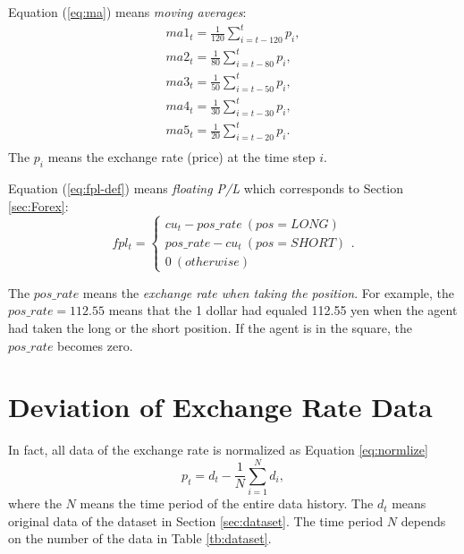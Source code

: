 Equation (\ref{eq:ma}) means {\it moving averages}:
\begin{equation}
  \label{eq:ma}
  \begin{array}{l}
    ma1_{t} = \frac{1}{120} \displaystyle \sum_{i=t-120}^{t} p_i, \\
    ma2_{t} = \frac{1}{80} \displaystyle \sum_{i=t-80}^{t} p_i,   \\
    ma3_{t} = \frac{1}{50} \displaystyle \sum_{i=t-50}^{t} p_i,   \\
    ma4_{t} = \frac{1}{30} \displaystyle \sum_{i=t-30}^{t} p_i,   \\
    ma5_{t} = \frac{1}{20} \displaystyle \sum_{i=t-20}^{t} p_i.   \\
  \end{array}
\end{equation}
The $p_i$ means the exchange rate (price) at the time step $i$.

Equation (\ref{eq:fpl-def}) means {\it floating P/L} which corresponds to Section \ref{sec:Forex}:
\begin{equation}
  \label{eq:fpl-def}
  fpl_{t} =
  \left\{
    \begin{array}{l}
      cu_{t} - pos\_rate  \ (pos=LONG)\\
      pos\_rate - cu_{t}  \ (pos=SHORT)\\
      0 \ (otherwise)
    \end{array}
  \right..
\end{equation}

The $pos\_rate$ means the {\it exchange rate when taking the position}. For example, the $pos\_rate=112.55$ means that the 1 dollar had equaled 112.55 yen when the agent had taken the long or the short position. If the agent is in the square, the $pos\_rate$ becomes zero.

\section{Deviation of Exchange Rate Data}
\label{sec:devEx}
In fact, all data of the exchange rate is normalized as Equation \ref{eq:normlize} 
\begin{equation}
  \label{eq:normlize}
  p_{t} = d_{t} - \frac{1}{N} \sum_{i=1}^{N} d_i,
\end{equation}
where the $N$ means the time period of the entire data history. The $d_t$ means original data of the dataset in Section \ref{sec:dataset}. The time period $N$ depends on the number of the data in Table \ref{tb:dataset}.


